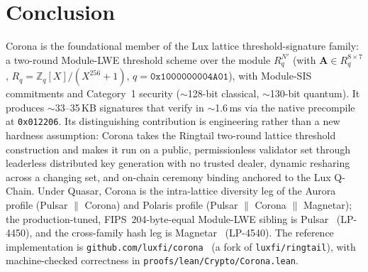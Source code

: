 \section{Conclusion}

\label{sec:conclusion}

Corona is the foundational member of the Lux lattice threshold-signature family: a
two-round Module-LWE threshold scheme over the module $R_q^{N'}$ (with
$\mathbf{A} \in R_q^{8 \times 7}$, $R_q = \mathbb{Z}_q[X]/(X^{256}+1)$,
$q = \texttt{0x1000000004A01}$), with Module-SIS commitments and Category~1 security
($\sim$128-bit classical, $\sim$130-bit quantum). It produces $\sim$33--35\,KB signatures
that verify in $\sim$1.6\,ms via the native precompile at \texttt{0x012206}. Its
distinguishing contribution is engineering rather than a new hardness assumption: Corona
takes the Ringtail two-round lattice threshold construction and makes it run on a public,
permissionless validator set through leaderless distributed key generation with no trusted
dealer, dynamic resharing across a changing set, and on-chain ceremony binding anchored to
the Lux Q-Chain. Under Quasar, Corona is the intra-lattice diversity leg of the Aurora
profile (Pulsar $\|$ Corona) and Polaris profile (Pulsar $\|$ Corona $\|$ Magnetar); the
production-tuned, FIPS~204-byte-equal Module-LWE sibling is Pulsar~\cite{pulsar}
(LP-4450), and the cross-family hash leg is Magnetar~\cite{magnetar} (LP-4540). The
reference implementation is \texttt{github.com/luxfi/corona}~\cite{corona} (a fork of
\texttt{luxfi/ringtail}), with machine-checked correctness in
\texttt{proofs/lean/Crypto/Corona.lean}.

